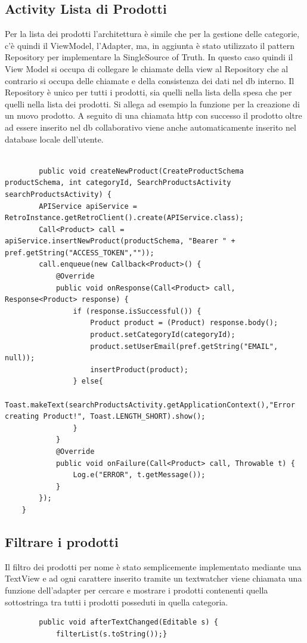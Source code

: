 \documentclass[12pt]{article}
\begin{document}
    \subsection{Activity Lista di Prodotti}
    Per la lista dei prodotti l'architettura è simile che per la gestione delle categorie, c'è quindi il ViewModel,
    l'Adapter, ma, in aggiunta è stato utilizzato il pattern Repository per implementare la SingleSource of Truth.
    In questo caso quindi il View Model si occupa di collegare le chiamate della view al Repository che al contrario    
    si occupa delle chiamate e della consistenza dei dati nel db interno. Il Repository è unico per tutti i prodotti, sia 
    quelli nella lista della spesa che per quelli nella lista dei prodotti. Si allega ad esempio la funzione per la creazione di
    un nuovo prodotto. A seguito di una chiamata http con successo il prodotto oltre ad essere inserito nel db collaborativo
    viene anche automaticamente inserito nel database locale dell'utente.
    \\\\
    \begin{lstlisting}
        public void createNewProduct(CreateProductSchema productSchema, int categoryId, SearchProductsActivity searchProductsActivity) {
        APIService apiService = RetroInstance.getRetroClient().create(APIService.class);
        Call<Product> call = apiService.insertNewProduct(productSchema, "Bearer " + pref.getString("ACCESS_TOKEN",""));
        call.enqueue(new Callback<Product>() {
            @Override
            public void onResponse(Call<Product> call, Response<Product> response) {
                if (response.isSuccessful()) {
                    Product product = (Product) response.body();
                    product.setCategoryId(categoryId);
                    product.setUserEmail(pref.getString("EMAIL", null));
                    insertProduct(product);
                } else{
                    Toast.makeText(searchProductsActivity.getApplicationContext(),"Error creating Product!", Toast.LENGTH_SHORT).show();
                }
            }
            @Override
            public void onFailure(Call<Product> call, Throwable t) {
                Log.e("ERROR", t.getMessage());
            }
        });
    }
    \end{lstlisting}
    \subsection{Filtrare i prodotti}
    Il filtro dei prodotti per nome è stato semplicemente implementato mediante una TextView e ad ogni carattere inserito
    tramite un textwatcher viene chiamata una funzione dell'adapter per cercare e mostrare i prodotti contenenti quella sottostringa
    tra tutti i prodotti posseduti in quella categoria.
    \begin{lstlisting}
        public void afterTextChanged(Editable s) {
            filterList(s.toString());}
    \end{lstlisting}
\end{document}
